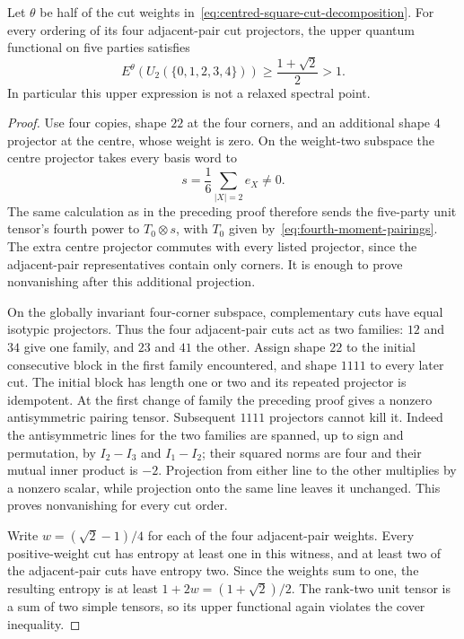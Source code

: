 \begin{corollary}
\label{cor:centred-square-upper-fails}
Let $\theta$ be half of the cut weights in~\eqref{eq:centred-square-cut-decomposition}.  For every ordering of its four adjacent-pair cut projectors, the upper quantum functional on five parties satisfies
\[
 E^\theta(U_2(\{0,1,2,3,4\}))\geq\frac{1+\sqrt2}{2}>1.
\]
In particular this upper expression is not a relaxed spectral point.
\end{corollary}
\begin{proof}
Use four copies, shape $22$ at the four corners, and an additional shape $4$ projector at the centre, whose weight is zero.  On the weight-two subspace the centre projector takes every basis word to
\[
 s=\frac16\sum_{|X|=2}e_X\ne0.
\]
The same calculation as in the preceding proof therefore sends the five-party unit tensor's fourth power to $T_0\otimes s$, with $T_0$ given by~\eqref{eq:fourth-moment-pairings}.  The extra centre projector commutes with every listed projector, since the adjacent-pair representatives contain only corners.  It is enough to prove nonvanishing after this additional projection.

On the globally invariant four-corner subspace, complementary cuts have equal isotypic projectors.  Thus the four adjacent-pair cuts act as two families: $12$ and $34$ give one family, and $23$ and $41$ the other.  Assign shape $22$ to the initial consecutive block in the first family encountered, and shape $1111$ to every later cut.  The initial block has length one or two and its repeated projector is idempotent.  At the first change of family the preceding proof gives a nonzero antisymmetric pairing tensor.  Subsequent $1111$ projectors cannot kill it.  Indeed the antisymmetric lines for the two families are spanned, up to sign and permutation, by $I_2-I_3$ and $I_1-I_2$; their squared norms are four and their mutual inner product is $-2$.  Projection from either line to the other multiplies by a nonzero scalar, while projection onto the same line leaves it unchanged.  This proves nonvanishing for every cut order.

Write $w=(\sqrt2-1)/4$ for each of the four adjacent-pair weights.  Every positive-weight cut has entropy at least one in this witness, and at least two of the adjacent-pair cuts have entropy two.  Since the weights sum to one, the resulting entropy is at least $1+2w=(1+\sqrt2)/2$.  The rank-two unit tensor is a sum of two simple tensors, so its upper functional again violates the cover inequality.
\end{proof}


